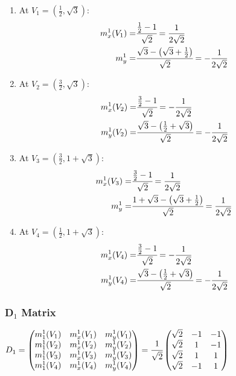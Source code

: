 \documentclass{article}
\begin{document}
\begin{multicols}{2}
\begin{enumerate}
    \item At $V_1 = \left(\frac{1}{2},\sqrt{3}\right):$
    \begin{align*}
    m_x^1(V_1) =& \cfrac{\frac{1}{2}-1}{\sqrt{2}} = \frac{1}{2\sqrt{2}}\\
    m_y^1 =& \cfrac{\sqrt{3} -\left(\sqrt{3} + \frac{1}{2}\right)}{\sqrt{2}} = -\frac{1}{2\sqrt{2}}
    \end{align*}

    \item At $V_2 = \left(\frac{3}{2},\sqrt{3}\right):$
    \begin{align*}
    m_x^1(V_2) =& \cfrac{\frac{3}{2}-1}{\sqrt{2}} = -\frac{1}{2\sqrt{2}}\\
    m_y^1(V_2) =& \cfrac{\sqrt{3} - \left(\frac{1}{2} + \sqrt{3}\right)}{\sqrt{2}} =-\cfrac{1}{2\sqrt{2}}
    \end{align*}

    \item At $V_3 = \left(\frac{3}{2},1+\sqrt{3}\right):$
    \begin{align*}
    m_x^1(V_3) =& \cfrac{\frac{3}{2}-1}{\sqrt{2}} = \frac{1}{2\sqrt{2}}\\
    m_y^1 =& \cfrac{1+\sqrt{3} -\left(\sqrt{3} + \frac{1}{2}\right)}{\sqrt{2}} = \frac{1}{2\sqrt{2}}
    \end{align*}

    \item At $V_4 = \left(\frac{1}{2},1+\sqrt{3}\right):$
    \begin{align*}
    m_x^1(V_4) =& \cfrac{\frac{3}{2}-1}{\sqrt{2}} = -\frac{1}{2\sqrt{2}}\\
    m_y^1(V_4) =& \cfrac{\sqrt{3} - \left(\frac{1}{2} + \sqrt{3}\right)}{\sqrt{2}} =-\cfrac{1}{2\sqrt{2}}
    \end{align*}
\end{enumerate}
\end{multicols}

\subsubsection{D$_1$ Matrix}
$D_1 = \begin{pmatrix}
    m_1^1(V_1) & m_x^1(V_1) & m_y^1(V_1)\\
    m_1^1(V_2) & m_x^1(V_2) & m_y^1(V_2)\\
    m_1^1(V_3) & m_x^1(V_3) & m_y^1(V_3)\\
    m_1^1(V_4) & m_x^1(V_4) & m_y^1(V_4)\\
\end{pmatrix} =
\cfrac{1}{\sqrt{2}}\begin{pmatrix}
    \sqrt{2} & -1 & -1\\
    \sqrt{2} & 1 & -1\\
    \sqrt{2} & 1 & 1\\
    \sqrt{2} & -1 & 1\\
\end{pmatrix}$
\end{document}
